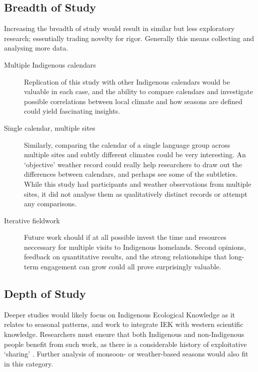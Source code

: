 \subsection{Breadth of Study}
Increasing the breadth of study would result in similar but less exploratory
research; essentially trading novelty for rigor.  Generally this means
collecting and analysing more data.

\begin{description}
\item[Multiple Indigenous calendars]
    Replication of this study with other Indigenous calendars would be
    valuable in each case, and the ability to compare calendars and investigate
    possible correlations between local climate and how seasons are defined
    could yield fascinating insights.

\item[Single calendar, multiple sites]
    Similarly, comparing the calendar of a single language group across
    multiple sites and subtly different climates could be very interesting.
    An `objective' weather record could really help researchers to draw out
    the differences between calendars, and perhaps see some of the subtleties.
    While this study had participants and weather observations from multiple
    sites, it did not analyse them as qualitatively distinct records or
    attempt any comparisons.

\item[Iterative fieldwork]
    Future work should if at all possible invest the time and resources
    neccessary for multiple visits to Indigenous homelands.  Second opinions,
    feedback on quantitative results, and the strong relationships that
    long-term engagement can grow could all prove surprisingly valuable.
\end{description}

\subsection{Depth of Study}
Deeper studies would likely focus on Indigenous Ecological Knowledge as it
relates to seasonal patterns, and work to integrate IEK with western scientific
knowledge.  Researchers must ensure that both Indigenous and non-Indigenous
people benefit from such work, as there is a considerable history of
exploitative `sharing' \citep[eg.][]{smith1999}.  Further analysis of monsoon-
or weather-based seasons would also fit in this category.

